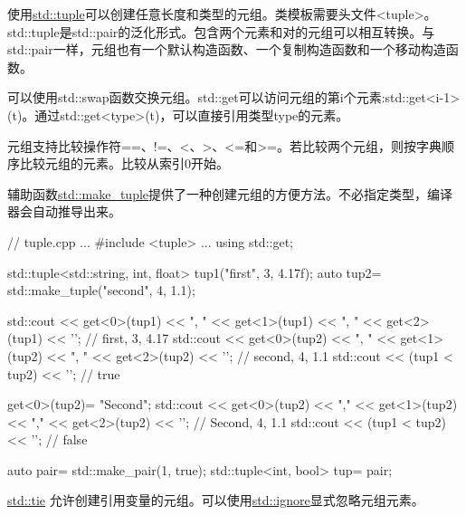 使用\href{http://en.cppreference.com/w/cpp/utility/tuple}{std::tuple}可以创建任意长度和类型的元组。类模板需要头文件<tuple>。std::tuple是std::pair的泛化形式。包含两个元素和对的元组可以相互转换。与std::pair一样，元组也有一个默认构造函数、一个复制构造函数和一个移动构造函数。

可以使用std::swap函数交换元组。std::get可以访问元组的第i个元素:std::get<i-1>(t)。通过std::get<type>(t)，可以直接引用类型type的元素。

元组支持比较操作符==、!=、<、>、<=和>=。若比较两个元组，则按字典顺序比较元组的元素。比较从索引0开始。


辅助函数\href{http://en.cppreference.com/w/cpp/utility/tuple/make_tuple}{std::make\_tuple}提供了一种创建元组的方便方法。不必指定类型，编译器会自动推导出来。


\begin{cpp}
// tuple.cpp
...
#include <tuple>
...
using std::get;

std::tuple<std::string, int, float> tup1("first", 3, 4.17f);
auto tup2= std::make_tuple("second", 4, 1.1);

std::cout << get<0>(tup1) << ", " << get<1>(tup1) << ", "
		  << get<2>(tup1) << '\n'; // first, 3, 4.17
std::cout << get<0>(tup2) << ", " << get<1>(tup2) << ", "
		  << get<2>(tup2) << '\n'; // second, 4, 1.1
std::cout << (tup1 < tup2) << '\n'; // true

get<0>(tup2)= "Second";
std::cout << get<0>(tup2) << "," << get<1>(tup2) << ","
		  << get<2>(tup2) << '\n'; // Second, 4, 1.1
std::cout << (tup1 < tup2) << '\n'; // false

auto pair= std::make_pair(1, true);
std::tuple<int, bool> tup= pair;
\end{cpp}


\href{http://en.cppreference.com/w/cpp/utility/tuple/tie}{std::tie} 允许创建引用变量的元组。可以使用\href{http://en.cppreference.com/w/cpp/utility/tuple/ignore}{std::ignore}显式忽略元组元素。


